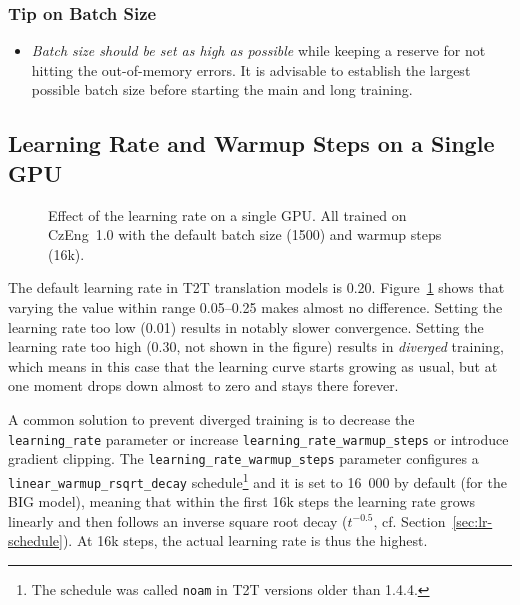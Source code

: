 \documentclass{pbmlarxiv} \pdfoutput=1
\def\recommend#1{\textsl{#1}}
\def\Sref#1{Section~\ref{#1}}
\begin{document}
\subsubsection*{Tip on Batch Size}
\begin{itemize}
\item \recommend{Batch size should be set as high as possible}
      while keeping a reserve for not hitting the out-of-memory errors.
      It is advisable to establish the largest
      possible batch size before starting the main and long training.
\end{itemize}


\subsection{Learning Rate and Warmup Steps on a Single GPU}\label{sec:learning-rate}

\begin{figure}
\vspace{-5mm}
\caption{Effect of the learning rate on a single GPU.
 All trained on CzEng~1.0 with the default batch size (1500) and warmup steps (16k).}
\label{fig:learning-rate}
\end{figure}

The default learning rate in T2T translation models is 0.20.
Figure~\ref{fig:learning-rate} shows that varying the value within range 0.05--0.25
 makes almost no difference.
Setting the learning rate too low (0.01) results in notably slower convergence.
Setting the learning rate too high (0.30, not shown in the figure)
 results in \emph{diverged} training,
 which means in this case that the learning curve starts growing as usual,
 but at one moment drops down almost to zero
 and stays there forever.

A common solution to prevent diverged training is
 to decrease the \texttt{learning\_ra\-te} parameter
 or increase \verb|learning_rate_warmup_steps|
 or introduce gradient clipping.
The \texttt{learning\_rate\_warmup\_steps} parameter %
 configures a \texttt{linear\_warmup\_rsqrt\_decay} schedule\footnote{
 The schedule was called \texttt{noam} in T2T versions older than 1.4.4.
}
 and it is set to  16~000 by default (for the BIG model),
 meaning that within the first 16k steps the learning rate grows linearly
 and then follows an inverse square root decay ($t^{-0.5}$, cf. \Sref{sec:lr-schedule}).
At 16k steps, the actual learning rate is thus the highest.
\end{document}
